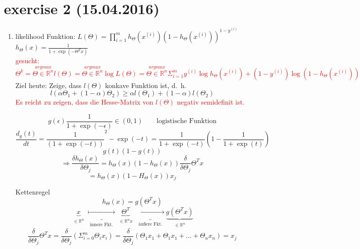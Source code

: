 \section*{exercise 2 (15.04.2016)}
\begin{enumerate}[(1)]
 \item likelihood Funktion: $L(\Theta) = \prod^m_{i=1} h_\Theta(x^{(i)}) (1-h_\Theta(x^{(i)}))^{1-y^{(i)}}$\\
 $h_\Theta(x) = \frac{1}{1+ \exp (- \Theta^T x)}$\\
 \textcolor{red}{ gesucht: $\Theta^k = \stackrel{argmax}{\Theta \in \mathbb{R}^n} l(\Theta) = \stackrel{argmax}{\Theta \in \mathbb{R}^n} \log L(\Theta) = \stackrel{argmax}{\Theta \in \mathbb{R}^n} \Sigma^m_{i=1} y^{(i)} \log h_\Theta(x^{(i)}) + (1-y^{(i)}) \log (1- h_\Theta(x^{(i)}))$}\\
 Ziel heute: Zeige, dass $l(\Theta)$ konkave Funktion ist, d.~h.
 \[l(\alpha \Theta_1 + (1- \alpha) \Theta_2) \geq \alpha l(\Theta_1) + (1-\alpha) l(\Theta_2)\]
\textcolor{red}{Es reicht zu zeigen, dass die Hesse-Matrix von $l(\Theta)$ negativ semidefinit ist.}

\begin{framed}

\[g(\epsilon) \frac{1}{1+\exp(-\epsilon)} \in (0,1) \quad\quad \text{logistische Funktion}\]
\[\frac{d_g(t)}{dt} = \frac{1}{(1+ \exp (-t))}^2 - \exp(-t) = \frac{1}{1+\exp (-t)} \left(1- \frac{1}{1+\exp (t)}\right)\]
\[g(t)(1-g(t))\]
\[\Rightarrow \frac{\delta h_\Theta(x)}{\delta \Theta_j} = h_\Theta(x)(1-h_\Theta(x)) \frac{\delta}{\delta \Theta_j} \Theta^T x\]
\[= h_\Theta(x)(1-H_\Theta(x))x_j\]
\begin{framed}
Kettenregel
\[h_\Theta(x) = g(\Theta^T x)\]
\[\underbrace{x}_{\substack{\in \mathbb{R}^n}} \underbrace{\mapsto}_{\substack{\text{innere Fkt.}}} \underbrace{\Theta^T}_{\substack{\in \mathbb{R}^n x}} \underbrace{\mapsto}_{\substack{\text{äußere Fkt.}}} \underbrace{g(\Theta^T x)}_{\substack{\in \mathbb{R}^n}}\]
\[\frac{\delta}{\delta \Theta_j} \Theta^T x = \frac{\delta}{\delta\Theta_j}(\Sigma^m_{i=0} \Theta_i x_i) = \frac{\delta}{\delta\Theta_j}(\Theta_1 x_1 + \Theta_1 x_1 + \dots + \Theta_n  x_n) = x_j\]
\end{framed}
\end{framed}



\end{enumerate}
